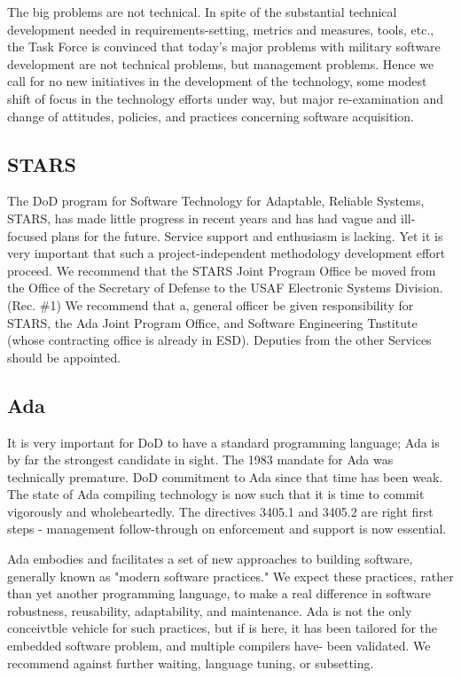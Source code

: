 \documentclass[12pt]{article}
\begin{document}
The big problems are not technical. In spite of the substantial technical
development needed in requirements-setting, metrics and measures, tools, etc.,
the Task Force is convinced that today's major problems with military software
development are not technical problems, but management problems. Hence we call
for no new initiatives in the development of the technology, some modest shift
of focus in the technology efforts under way, but major re-examination and
change of attitudes, policies, and practices concerning software acquisition.

\subsection*{STARS}

The DoD program for Software Technology for Adaptable, Reliable Systems,
STARS, has made little progress in recent years and has had vague and
ill-focused plans for the future. Service support and enthusiasm is lacking.
Yet it is very important that such a project-independent methodology
development effort proceed. We recommend that the STARS Joint Program Office
be moved from the Office of the Secretary of Defense to the USAF Electronic
Systems Division. (Rec. \#1) We recommend that a, general officer be given
responsibility for STARS, the Ada Joint Program Office, and Software
Engineering Tnstitute (whose contracting office is already in ESD). Deputies
from the other Services should be appointed.

\subsection*{Ada}

It is very important for DoD to have a standard programming language; Ada is
by far the strongest candidate in sight. The 1983 mandate for Ada was
technically premature. DoD commitment to Ada since that time has been weak.
The state of Ada compiling technology is now such that it is time to commit
vigorously and wholeheartedly.  The directives 3405.1 and 3405.2 are right
first steps - management follow-through on enforcement and support is now
essential.

Ada embodies and facilitates a set of new approaches to building software,
generally known as "modern software practices." We expect these practices,
rather than yet another programming language, to make a real difference in
software robustness, reusability, adaptability, and maintenance. Ada is not
the only conceivtble vehicle for such practices, but if is here, it has been
tailored for the embedded software problem, and multiple compilers have- been
validated. We recommend against further waiting, language tuning, or
subsetting.
\end{document}
